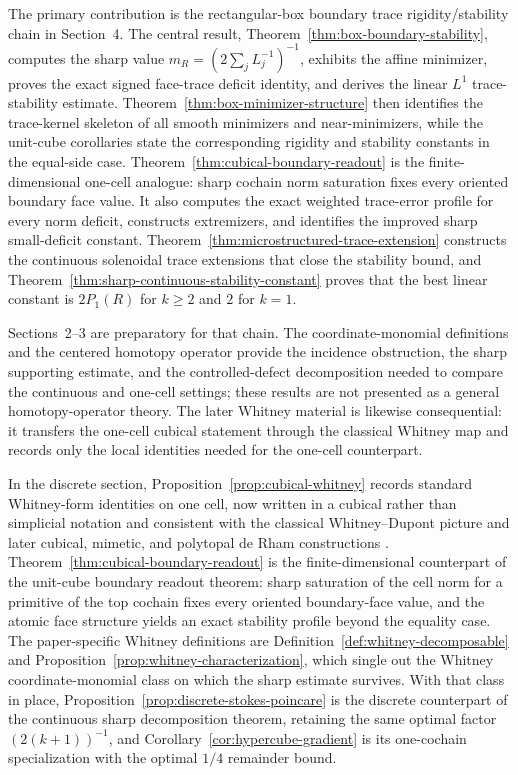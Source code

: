 \documentclass[11pt,letterpaper]{article}
\numberwithin{equation}{section}
\theoremstyle{plain}
\theoremstyle{definition}
\theoremstyle{remark}
\begin{document}
The primary contribution is the rectangular-box boundary trace
rigidity/stability chain in Section~4. The central result,
Theorem~\ref{thm:box-boundary-stability}, computes the sharp value
$m_R=(2\sum_jL_j^{-1})^{-1}$, exhibits the affine minimizer, proves the exact
signed face-trace deficit identity, and derives the linear $L^1$ trace-stability
estimate.  Theorem~\ref{thm:box-minimizer-structure} then identifies the
trace-kernel skeleton of all smooth minimizers and near-minimizers, while the
unit-cube corollaries state the corresponding rigidity and stability constants
in the equal-side case.  Theorem~\ref{thm:cubical-boundary-readout} is the
finite-dimensional one-cell analogue: sharp cochain norm saturation fixes every
oriented boundary face value. It also computes the exact weighted trace-error
profile for every norm deficit, constructs extremizers, and identifies the
improved sharp small-deficit constant.
Theorem~\ref{thm:microstructured-trace-extension} constructs the continuous
solenoidal trace extensions that close the stability bound, and
Theorem~\ref{thm:sharp-continuous-stability-constant} proves that the best
linear constant is $2P_1(R)$ for $k\ge2$ and $2$ for $k=1$.

Sections~2--3 are preparatory for that chain.  The coordinate-monomial
definitions and the centered homotopy operator provide the incidence
obstruction, the sharp supporting estimate, and the controlled-defect
decomposition needed to compare the continuous and one-cell settings; these
results are not presented as a general homotopy-operator theory.  The later
Whitney material is likewise consequential: it transfers the one-cell cubical
statement through the classical Whitney map and records only the local identities
needed for the one-cell counterpart.

In the discrete section, Proposition~\ref{prop:cubical-whitney} records
standard Whitney-form identities on one cell, now written in a cubical rather
than simplicial notation and consistent with the classical Whitney--Dupont
picture and later cubical, mimetic, and polytopal de Rham constructions
\cite{Whitney1957,Dupont1976,ArnoldAwanou2014,BuffaChristiansen2007,Gillette2016,DiPietroDroniou2020}.
Theorem~\ref{thm:cubical-boundary-readout}
is the finite-dimensional counterpart of the unit-cube boundary readout
theorem: sharp saturation of the cell norm for a primitive of the top cochain
fixes every oriented boundary-face value, and the atomic face structure yields
an exact stability profile beyond the equality case. The paper-specific Whitney
definitions are Definition~\ref{def:whitney-decomposable} and
Proposition~\ref{prop:whitney-characterization}, which single out the Whitney
coordinate-monomial class on which the sharp estimate survives. With that class
in place, Proposition~\ref{prop:discrete-stokes-poincare} is the discrete
counterpart of the continuous sharp decomposition theorem, retaining the same
optimal factor $(2(k+1))^{-1}$, and Corollary~\ref{cor:hypercube-gradient} is
its one-cochain specialization with the optimal $1/4$ remainder bound.
\end{document}
